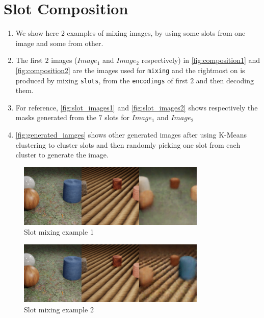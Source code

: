 \section{Slot Composition}

\begin{enumerate}
\item 
We show here $2$ examples of mixing images, by using some slots from one image and some from other. 

\item The first $2$ images ($Image_1$ and $Image_2$ respectively) in \autoref{fig:composition1} and \autoref{fig:composition2}
are the images used for \verb|mixing| and the rightmost on is produced by mixing \verb|slots|, from the \verb|encodings| of first $2$ and then decoding them.

\item 
For reference, \autoref{fig:slot_images1} and \autoref{fig:slot_images2}  shows respectively the masks generated from the $7$ slots for $Image_1$ and $Image_2$

\item \autoref{fig:generated_iamges} shows other generated images after using K-Means clustering to cluster slots and then randomly picking one slot from each cluster to generate the image.

\end{enumerate}

\begin{figure}[hbt!]
    \centering
    \includegraphics[width=0.8\textwidth]{images/mixed_1.png} 
    \caption{Slot mixing example 1}
    \label{fig:composition1}
\end{figure}

\begin{figure}[hbt!]
    \centering
    \includegraphics[width=0.8\textwidth]{images/mixed_2.png} 
    \caption{Slot mixing example 2}
    \label{fig:composition2}
\end{figure}

